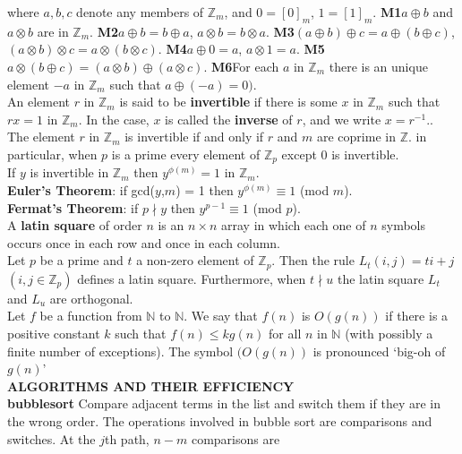 \documentclass[10pt,landscape]{article}
\begin{document}
\begin{multicols}{4}
where $a,b,c$ denote any members of $\mathbb{Z}_{m}$, and $0
= [0]_{m}$, $1 = [1]_{m}$.
\textbf{M1}$a \oplus b$ and $a \otimes b$ are in $\mathbb{Z}_{m}$.
\textbf{M2}$a \oplus b = b \oplus a$, $a \otimes b = b \otimes a$.
\textbf{M3}$(a \oplus b) \oplus c = a \oplus (b \oplus c)$, $(a
\otimes b) \otimes c = a \otimes (b \otimes c)$.
\textbf{M4}$a \oplus 0 = a$, $a \otimes 1 = a$.
\textbf{M5}$a \otimes (b \oplus c) = (a \otimes b) \oplus (a \otimes c)$.
\textbf{M6}For each $a$ in $\mathbb{Z}_{m}$ there is  an unique
element $-a$ in $\mathbb{Z}_{m}$ such that $a \oplus(-a) = 0)$.\\
An element $r$ in $\mathbb{Z}_{m}$ is said to be \textbf{invertible}
if there is some $x$ in $\mathbb{Z}_{m}$ such that $rx = 1$ in
$\mathbb{Z}_{m}$. In the case, $x$ is called the \textbf{inverse} of
$r$, and we write $x = r^{-1}.$.\\
The element $r$ in $\mathbb{Z}_{m}$ is invertible if and only if $r$
and $m$ are coprime in $\mathbb{Z}$. in particular, when $p$ is a
prime every element of $\mathbb{Z}_{p}$ except 0 is invertible.\\
If $y$ is invertible in $\mathbb{Z}_{m}$ then $y^{\phi (m)} = 1$ in
$\mathbb{Z}_{m}$.\\
\textbf{Euler's Theorem}: if gcd($y$,$m$) = 1 then $y^{\phi (m)}
\equiv 1$ (mod $m$).\\
\textbf{Fermat's Theorem}: if $p \nmid y$ then $y^{p-1} \equiv 1$ (mod
$p$).\\
A \textbf{latin square} of order $n$ is an $n \times n$ array in which
each one of $n$ symbols occurs once in each row and once in each
column.\\
Let $p$ be a prime and $t$ a non-zero element of
$\mathbb{Z}_{p}$. Then the rule $L_{t}(i,j) =ti+j$ $(i,j \in
\mathbb{Z}_{p})$ defines a latin square. Furthermore, when $t \nmid u$
the latin square $L_{t}$ and $L_{u}$ are orthogonal.\\
Let $f$ be a function from $\mathbb{N}$ to $\mathbb{N}$. We say that
$f(n)$ is $O(g(n))$ if there is a positive constant $k$ such that
$f(n) \leq kg(n)$ for all $n$ in $\mathbb{N}$ (with possibly a finite
number of exceptions). The symbol $(O(g(n))$ is pronounced `big-oh of
$g(n)$'\\
\textbf{ALGORITHMS AND THEIR EFFICIENCY}\\
\textbf{bubblesort} Compare adjacent terms in the list and switch them
if they are in the wrong order. The operations involved in bubble sort
are comparisons and switches. At the $j$th path, $n-m$ comparisons are

\end{multicols}
\end{document}
